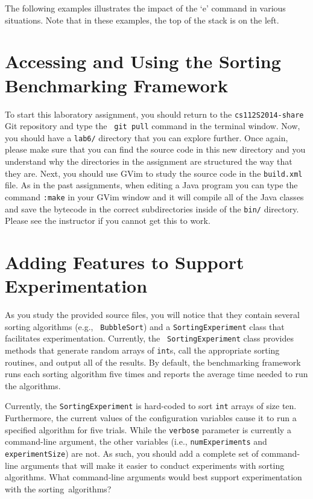 The following examples illustrates the impact of the `e' command in
various situations. Note that in these examples, the top of the stack is
on the left.



\section*{Accessing and Using the Sorting Benchmarking Framework}

To start this laboratory assignment, you should return to the {\tt cs112S2014-share} Git repository and type the {\tt
git pull} command in the terminal window.  Now, you should have a {\tt lab6/} directory that you can explore further.
Once again, please make sure that you can find the source code in this new directory and you understand why the
directories in the assignment are structured the way that they are. Next, you should use GVim to study the source code in
the {\tt build.xml} file.  As in the past assignments, when editing a Java program you can type the command {\tt :make}
in your GVim window and it will compile all of the Java classes and save the bytecode in the correct subdirectories
inside of the {\tt bin/} directory.  Please see the instructor if you cannot get this to work.

\section*{Adding Features to Support Experimentation}

As you study the provided source files, you will notice that they contain several sorting algorithms (e.g., {\tt
  BubbleSort}) and a {\tt SortingExperiment} class that facilitates experimentation. Currently, the {\tt
  SortingExperiment} class provides methods that generate random arrays of {\tt int}s, call the appropriate sorting
routines, and output all of the results.  By default, the benchmarking framework runs each sorting algorithm five times
and reports the average time needed to run the algorithms.

Currently, the {\tt SortingExperiment} is hard-coded to sort {\tt int} arrays of size ten. Furthermore, the current
values of the configuration variables cause it to run a specified algorithm for five trials.  While the {\tt verbose}
parameter is currently a command-line argument, the other variables (i.e., {\tt numExperiments} and {\tt
  experimentSize}) are not.  As such, you should add a complete set of command-line arguments that will make it easier
to conduct experiments with sorting algorithms. What command-line arguments would best support experimentation with 
the \mbox{sorting algorithms}?

